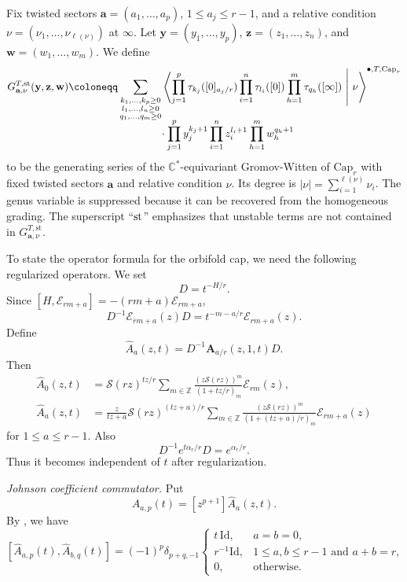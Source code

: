 \documentclass[letterpaper,12pt]{amsart}
\theoremstyle{definition}
\newcommand{\Scal}{\mathcal S}
\newcommand{\Ecal}{\mathcal E}
\newcommand{\C}{\mathbb C}
\newcommand{\Z}{\mathbb Z}
\newcommand{\OrbCap}{\mathrm{Cap}}
\numberwithin{equation}{section}
\begin{document}
Fix twisted sectors
\(\mathbf a=(a_1,\ldots,a_p)\), \(1\leq a_j\leq r-1\), and a relative
condition \(\nu=(\nu_1,\ldots,\nu_{\ell(\nu)})\) at \(\infty\). Let
\(\mathbf y=(y_1,\ldots,y_p)\),
\(\mathbf z=(z_1,\ldots,z_n)\), and
\(\mathbf w=(w_1,\ldots,w_m)\).  We define 
\begin{align}
G^{T,\mathrm{st}}_{\mathbf a,\nu}(\mathbf y,\mathbf z,\mathbf w)
\coloneqq &
\sum_{\substack{k_1,\ldots,k_p\geq0\\
                l_1,\ldots,l_n\geq0\\
                q_1,\ldots,q_m\geq0}}
\left\langle
 \prod_{j=1}^{p}\tau_{k_j}([0]_{a_j/r})
 \prod_{i=1}^{n}\tau_{l_i}([0])
 \prod_{h=1}^{m}\tau_{q_h}([\infty])
 \ \middle|\ \nu
\right\rangle^{\bullet,T,\OrbCap_r}
\nonumber\\[-2mm]
&\hspace{14mm}\cdot
 \prod_{j=1}^{p}y_j^{k_j+1}
 \prod_{i=1}^{n}z_i^{l_i+1}
 \prod_{h=1}^{m}w_h^{q_h+1}
\label{eq:eq-cap-potential}
\end{align}
to be the generating series of the $\C^*$-equivariant Gromov-Witten of $\OrbCap_r$ with fixed twisted sectors $\mathbf a$ and relative condition $\nu$. Its degree is
\(|\nu|=\sum_{i=1}^{\ell(\nu)}\nu_i\). The genus
variable is suppressed because it can be recovered from the homogeneous grading.
The superscript ``\({\rm st}\)'' emphasizes that  unstable terms are not contained in $G^{T,\mathrm{st}}_{\mathbf a,\nu}$.

To state the operator formula for the orbifold cap, we need the following regularized operators. We set
\[
  D=t^{-H/r}.
\]
Since \([H,\Ecal_{rm+a}]=-(rm+a)\Ecal_{rm+a}\),
\[
  D^{-1}\Ecal_{rm+a}(z)D=t^{-m-a/r}\Ecal_{rm+a}(z).
\]
Define
\[
  \widehat A_a(z,t)=D^{-1}\boldsymbol A_{a/r}(z,1,t)D.
\]
Then
\begin{align}
\widehat A_0(z,t)
&=\Scal(rz)^{tz/r}
\sum_{m\in\Z}\frac{(z\Scal(rz))^m}{(1+tz/r)_m}\Ecal_{rm}(z),
\label{eq:A0hat}\\
\widehat A_a(z,t)
&=\frac{z}{tz+a}\Scal(rz)^{(tz+a)/r}
\sum_{m\in\Z}\frac{(z\Scal(rz))^m}{(1+(tz+a)/r)_m}\Ecal_{rm+a}(z)
\label{eq:Aahat}
\end{align}
for \(1\le a\le r-1\).  Also
\begin{equation}\label{eq:propagation-factor}
  D^{-1}e^{t\alpha_r/r}D=e^{\alpha_r/r}.
\end{equation}
Thus it becomes independent of \(t\) after regularization.

\smallskip
\noindent\emph{Johnson coefficient commutator.}
Put
\[
  \widehat A_{a,p}(t)=[z^{p+1}]\widehat A_a(z,t).
\]
By \cite[Lemma 8]{J}, we have
\begin{equation}\label{eq:johnson-commutator-support}
[\widehat A_{a,p}(t),\widehat A_{b,q}(t)]
=
(-1)^p\delta_{p+q,-1}
\begin{cases}
  t\,\mathrm{Id}, & a=b=0,\\[2mm]
  r^{-1}\mathrm{Id},
    & 1\leq a,b\leq r-1 \text{ and } a+b=r,\\[2mm]
  0, & \text{otherwise}.
\end{cases}
\end{equation}
\end{document}
